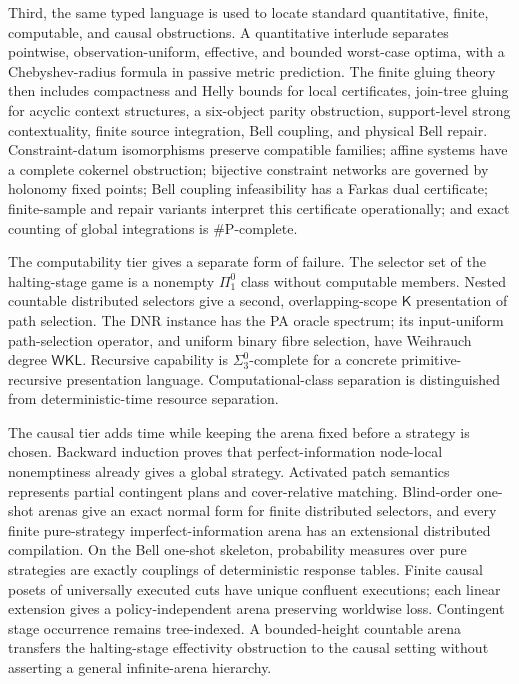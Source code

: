 \documentclass[11pt]{article}
\theoremstyle{plain}
\theoremstyle{definition}
\theoremstyle{remark}
\begin{document}
Third, the same typed language is used to locate standard quantitative, finite,
computable, and causal obstructions. A quantitative interlude separates
pointwise, observation-uniform, effective, and bounded worst-case optima, with a
Chebyshev-radius formula in passive metric prediction. The finite gluing theory
then includes compactness and Helly bounds for local certificates, join-tree
gluing for acyclic context structures, a six-object parity obstruction,
support-level strong contextuality, finite source integration, Bell coupling,
and physical Bell repair. Constraint-datum isomorphisms preserve compatible
families; affine systems have a complete cokernel obstruction; bijective
constraint networks are governed by holonomy fixed points; Bell coupling
infeasibility has a Farkas dual certificate; finite-sample and repair variants
interpret this certificate operationally; and exact counting of global
integrations is $\#\mathrm P$-complete.

The computability tier gives a separate form of failure. The selector set of the
halting-stage game is a nonempty $\Pi^0_1$ class without computable members.
Nested countable distributed selectors give a second, overlapping-scope
$\mathsf K$ presentation of path selection. The DNR instance has the PA oracle
spectrum; its input-uniform path-selection operator, and uniform binary fibre
selection, have Weihrauch degree $\mathsf{WKL}$. Recursive capability is
$\Sigma^0_3$-complete for a concrete primitive-recursive presentation language.
Computational-class separation is distinguished from deterministic-time resource
separation.

The causal tier adds time while keeping the arena fixed before a strategy is
chosen. Backward induction proves that perfect-information node-local
nonemptiness already gives a global strategy. Activated patch semantics
represents partial contingent plans and cover-relative matching. Blind-order
one-shot arenas give an exact normal form for finite distributed selectors, and
every finite pure-strategy imperfect-information arena has an extensional
distributed compilation. On the Bell one-shot skeleton, probability measures over
pure strategies are exactly couplings of deterministic response tables. Finite
causal posets of universally executed cuts have unique confluent executions;
each linear extension gives a policy-independent arena preserving worldwise
loss. Contingent stage occurrence remains tree-indexed. A bounded-height
countable arena transfers the halting-stage effectivity obstruction to the
causal setting without asserting a general infinite-arena hierarchy.
\end{document}
